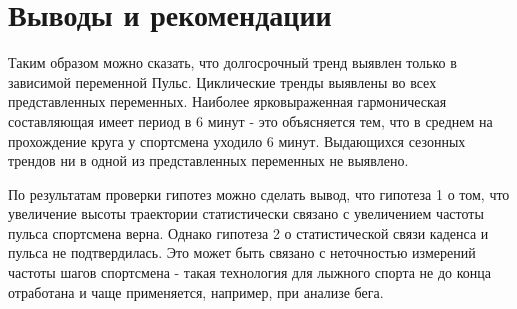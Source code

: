 \documentclass[a4paper,12pt]{article}
\begin{document}
\section{Выводы и рекомендации}
Таким образом можно сказать, что долгосрочный тренд выявлен только в зависимой переменной Пульс. Циклические тренды выявлены во всех представленных переменных. Наиболее ярковыраженная гармоническая составляющая имеет период в 6 минут - это объясняется тем, что в среднем на прохождение круга у спортсмена уходило 6 минут. Выдающихся сезонных трендов ни в одной из представленных переменных не выявлено.  

По результатам проверки гипотез можно сделать вывод, что гипотеза 1 о том, что увеличение высоты траектории статистически связано с увеличением частоты пульса спортсмена верна. Однако гипотеза 2 о статистической связи каденса и пульса не подтвердилась. Это может быть связано с неточностью измерений частоты шагов спортсмена - такая технология для лыжного спорта не до конца отработана и чаще применяется, например, при анализе бега.
\end{document}
